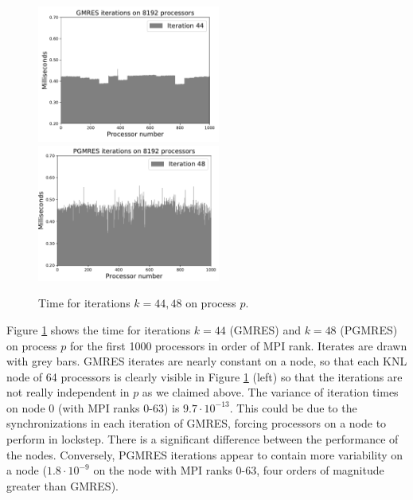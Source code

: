 \documentclass[num-refs]{wiley-article}
\begin{document}
\begin{figure}
\centering
\includegraphics[width=6cm]{../plots/GMRES_ex23_8192_1000000_independent_in_p_44.pdf}
\includegraphics[width=6cm]{../plots/PGMRES_ex23_8192_1000000_independent_in_p_48.pdf}
\caption{Time for iterations  $k=44, 48$ on process $p$. } \label{fig:ex23-independent}
\end{figure}


Figure \ref{fig:ex23-independent} shows the time for iterations $k=44$ (GMRES) and $k=48$ (PGMRES) on process $p$ for the first 1000 processors in order of MPI rank. Iterates are drawn with grey bars.
GMRES iterates are nearly constant on a node, so that each KNL node of 64 processors is clearly visible in Figure \ref{fig:ex23-independent} (left) so that the iterations are not really independent in $p$ as we claimed above. The variance of iteration times on node 0 (with MPI ranks 0-63) is $9.7 \cdot10^{-13}$. 
This could be due to the synchronizations in each iteration of GMRES, forcing processors on a node to perform in lockstep. 
There is a significant difference between the performance of the nodes.
Conversely, PGMRES iterations appear to contain more variability on a node ($1.8\cdot10^{-9}$ on the node with MPI ranks 0-63, four orders of magnitude greater than GMRES). 

\end{document}
